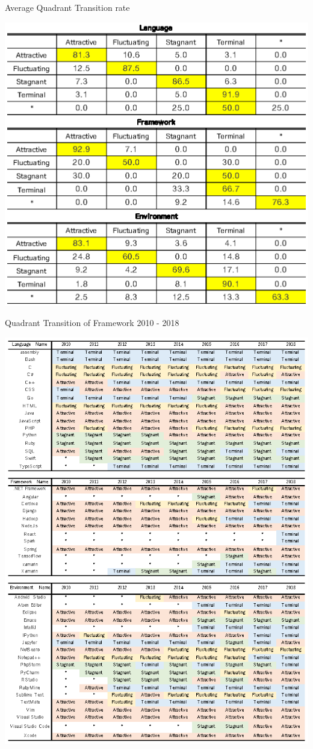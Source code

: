 \documentclass[conference]{IEEEtran}
\begin{document}
\begin{table}[t]
 \centering
 \caption{Average Quadrant Transition rate}
 \includegraphics[width=1.0\hsize]{img/transitionnew.eps} 
 \label{table2} 
\end{table}

\begin{table}[t]
 \centering
 \caption{Quadrant Transition of Framework 2010 - 2018} 
 \includegraphics[width=1.0\hsize]{img/AFSTnew.eps} 
 \label{table1} 
\end{table}
\end{document}
